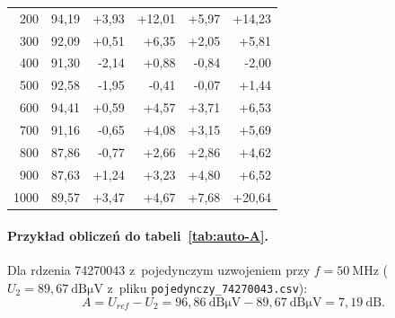 \documentclass[11pt,a4paper]{article}
\begin{document}
{\begin{longtable}{rrrrrr}
    200 & 94,19 & +3,93 & +12,01 & +5,97 & +14,23 \\
    300 & 92,09 & +0,51 & +6,35 & +2,05 & +5,81 \\
    400 & 91,30 & -2,14 & +0,88 & -0,84 & -2,00 \\
    500 & 92,58 & -1,95 & -0,41 & -0,07 & +1,44 \\
    600 & 94,41 & +0,59 & +4,57 & +3,71 & +6,53 \\
    700 & 91,16 & -0,65 & +4,08 & +3,15 & +5,69 \\
    800 & 87,86 & -0,77 & +2,66 & +2,86 & +4,62 \\
    900 & 87,63 & +1,24 & +3,23 & +4,80 & +6,52 \\
    1000 & 89,57 & +3,47 & +4,67 & +7,68 & +20,64 \\
\end{longtable}}

\paragraph{Przykład obliczeń do tabeli~\ref{tab:auto-A}.}
Dla rdzenia 74270043 z~pojedynczym uzwojeniem przy $f = 50\ \mathrm{MHz}$
($U_2 = 89{,}67\ \mathrm{dB\mu V}$ z~pliku \texttt{pojedynczy\_74270043.csv}):
\[
A = U_{ref} - U_2 = 96{,}86\ \mathrm{dB\mu V} - 89{,}67\ \mathrm{dB\mu V}
  = 7{,}19\ \mathrm{dB}.
\]
\end{document}
